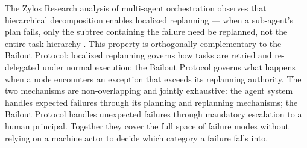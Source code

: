 The Zylos Research analysis of multi-agent orchestration observes that hierarchical decomposition enables localized replanning — when a sub-agent's plan fails, only the subtree containing the failure need be replanned, not the entire task hierarchy \cite{zylos-htn}. This property is orthogonally complementary to the Bailout Protocol: localized replanning governs how tasks are retried and re-delegated under normal execution; the Bailout Protocol governs what happens when a node encounters an exception that exceeds its replanning authority. The two mechanisms are non-overlapping and jointly exhaustive: the agent system handles expected failures through its planning and replanning mechanisms; the Bailout Protocol handles unexpected failures through mandatory escalation to a human principal. Together they cover the full space of failure modes without relying on a machine actor to decide which category a failure falls into.


